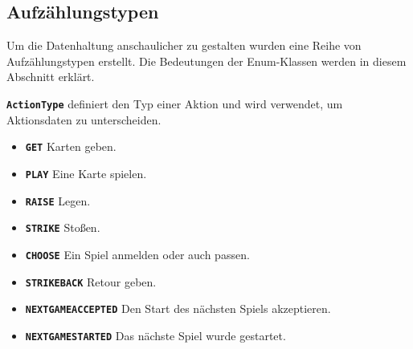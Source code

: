 \documentclass[
							a4paper, 
							11pt, 
							openany, 
							liststotoc,
							parskip=half, 
   							headings=normal
						]{scrreprt}
\begin{document}
{\clearpage

\subsection{Aufzählungstypen} \label{sse:anwendung_model_enums}
Um die Datenhaltung anschaulicher zu gestalten wurden eine Reihe von Aufzählungstypen erstellt. Die Bedeutungen der Enum-Klassen werden in diesem Abschnitt erklärt.

\textbf{\texttt{ActionType}} definiert den Typ einer Aktion und wird verwendet, um Aktionsdaten zu unterscheiden.
\begin{itemize}
	\item \textbf{\texttt{GET}} Karten geben.
	\item \textbf{\texttt{PLAY}}	Eine Karte spielen.
	\item \textbf{\texttt{RAISE}} Legen.
	\item \textbf{\texttt{STRIKE}} Stoßen.
	\item \textbf{\texttt{CHOOSE}} Ein Spiel anmelden oder auch passen.
	\item \textbf{\texttt{STRIKEBACK}} Retour geben.
	\item \textbf{\texttt{NEXTGAMEACCEPTED}} Den Start des nächsten Spiels akzeptieren.
	\item \textbf{\texttt{NEXTGAMESTARTED}} Das nächste Spiel wurde gestartet.
\end{itemize}\bigskip

}
\end{document}
